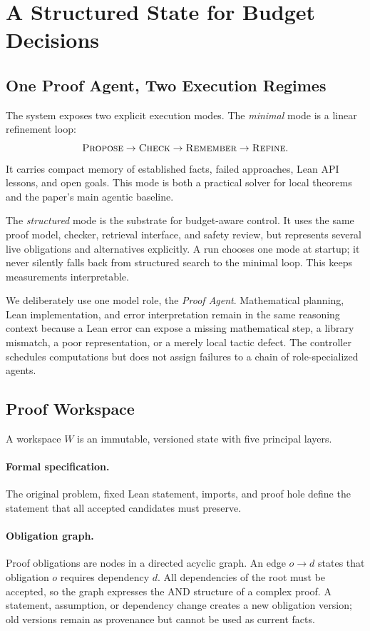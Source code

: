\section{A Structured State for Budget Decisions}

\subsection{One Proof Agent, Two Execution Regimes}

The system exposes two explicit execution modes. The \emph{minimal} mode is a
linear refinement loop:
\[
\textsc{Propose}\rightarrow\textsc{Check}\rightarrow
\textsc{Remember}\rightarrow\textsc{Refine}.
\]
It carries compact memory of established facts, failed approaches, Lean API
lessons, and open goals. This mode is both a practical solver for local
theorems and the paper's main agentic baseline.

The \emph{structured} mode is the substrate for budget-aware control. It uses
the same proof model, checker, retrieval interface, and safety review, but
represents several live obligations and alternatives explicitly. A run chooses
one mode at startup; it never silently falls back from structured search to
the minimal loop. This keeps measurements interpretable.

We deliberately use one model role, the \emph{Proof Agent}. Mathematical
planning, Lean implementation, and error interpretation remain in the same
reasoning context because a Lean error can expose a missing mathematical step,
a library mismatch, a poor representation, or a merely local tactic defect.
The controller schedules computations but does not assign failures to a chain
of role-specialized agents.

\subsection{Proof Workspace}

A workspace \(W\) is an immutable, versioned state with five principal layers.

\paragraph{Formal specification.}
The original problem, fixed Lean statement, imports, and proof hole define the
statement that all accepted candidates must preserve.

\paragraph{Obligation graph.}
Proof obligations are nodes in a directed acyclic graph. An edge
\(o\rightarrow d\) states that obligation \(o\) requires dependency \(d\).
All dependencies of the root must be accepted, so the graph expresses the AND
structure of a complex proof. A statement, assumption, or dependency change
creates a new obligation version; old versions remain as provenance but cannot
be used as current facts.

